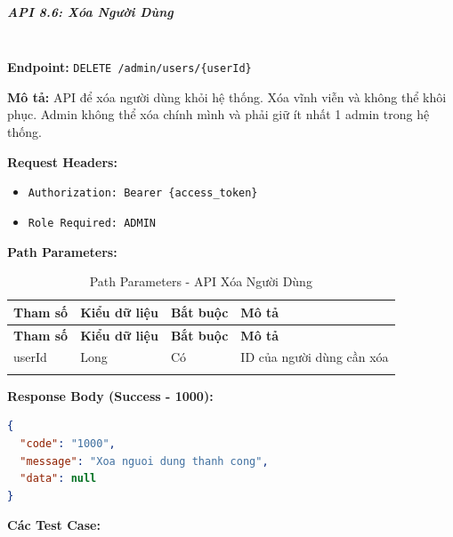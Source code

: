 \normalsize

\subparagraph{API 8.6: Xóa Người Dùng}~\\

\textbf{Endpoint:} \texttt{DELETE /admin/users/\{userId\}}

\textbf{Mô tả:} API để xóa người dùng khỏi hệ thống. Xóa vĩnh viễn và không thể khôi phục. Admin không thể xóa chính mình và phải giữ ít nhất 1 admin trong hệ thống.

\textbf{Request Headers:}
\begin{itemize}
    \item \texttt{Authorization: Bearer \{access\_token\}}
    \item \texttt{Role Required: ADMIN}
\end{itemize}

\textbf{Path Parameters:}

\small
\begin{longtable}{|>{\raggedright\arraybackslash}p{3.5cm}|>{\raggedright\arraybackslash}p{2.5cm}|>{\raggedright\arraybackslash}p{2cm}|>{\raggedright\arraybackslash}p{5.5cm}|}
\hline
\textbf{Tham số} & \textbf{Kiểu dữ liệu} & \textbf{Bắt buộc} & \textbf{Mô tả} \\
\hline
\endfirsthead
\hline
\textbf{Tham số} & \textbf{Kiểu dữ liệu} & \textbf{Bắt buộc} & \textbf{Mô tả} \\
\hline
\endhead
userId & Long & Có & ID của người dùng cần xóa \\
\hline
\caption{Path Parameters - API Xóa Người Dùng}
\end{longtable}

\textbf{Response Body (Success - 1000):}

\begin{lstlisting}[language=json, caption=Response thanh cong API 8.6]
{
  "code": "1000",
  "message": "Xoa nguoi dung thanh cong",
  "data": null
}
\end{lstlisting}

\textbf{Các Test Case:}


